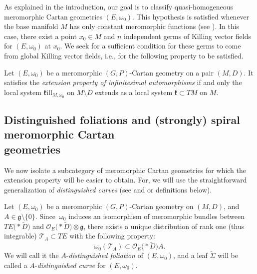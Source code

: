 \documentclass[pdftex]{sigma}
\numberwithin{equation}{section}
\begin{document}
As explained in the introduction, our goal is to classify quasi-homogeneous meromorphic Cartan geometries $(E,\omega_0)$. This hypothesis is satisfied whenever the base manifold $M$ has only constant meromorphic functions (see \cite[Theorem 1.2]{Dumitrescu1}). In this case, there exist a point $x_0 \in M$ and $n$ independent germs of Killing vector fields for $(E,\omega_0)$ at $x_0$. We seek for a sufficient condition for these germs to come from global Killing vector fields, i.e., for the following property to be satisfied.

\begin{Definition}\label{extensionproperty} Let $(E,\omega_0)$ be a meromorphic $(G,P)$-Cartan geometry on a pair $(M,D)$. It satisfies the \textit{extension property of infinitesimal automorphisms} if and only the local system $\mathfrak{k}\mathfrak{i}\mathfrak{l}\mathfrak{l}_{M,\omega_0}$ on $M\setminus D$ extends as a local system $\mathfrak{k}\subset TM$ on $M$. \end{Definition}

\subsection[Distinguished foliations and (strongly) spiral meromorphic Cartan geometries]{Distinguished foliations and (strongly) spiral meromorphic Cartan \\ geometries}\label{sectionspiral}

We now isolate a subcategory of meromorphic Cartan geometries for which the extension property will be easier to obtain. For, we will use the straightforward generalization of \textit{distinguished curves} (see \cite[p.~112]{Cap} and \cite[Definition~4.16]{Sharpe} or definitions below).

Let $(E,\omega_0)$ be a meromorphic $(G,P)$-Cartan geometry on $(M,D)$, and $A\in \mathfrak{g}\setminus \{0\}$. Since~$\omega_0$ induces an isomorphism of meromorphic bundles between $TE\bigl(* \tilde{D}\bigr)$ and $\mathcal{O}_E\bigl(* \tilde{D}\bigr) \otimes \mathfrak{g}$, there exists a unique distribution of rank one (thus integrable) $\mathcal{T}_A \subset TE$ with the following property:
 \begin{equation}\label{definitionTA} \omega_0(\mathcal{T}_A) \subset \mathcal{O}_E\bigl(* \tilde{D}\bigr) A. \end{equation}
 We will call it the $A$-\textit{distinguished foliation} of $(E,\omega_0)$, and a leaf $\tilde{\Sigma}$ will be called a $A$-\textit{distinguished curve} for $(E,\omega_0)$.
\end{document}
